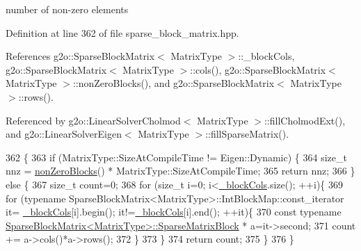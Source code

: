 number of non-\/zero elements 



Definition at line 362 of file sparse\+\_\+block\+\_\+matrix.\+hpp.



References g2o\+::\+Sparse\+Block\+Matrix$<$ Matrix\+Type $>$\+::\+\_\+block\+Cols, g2o\+::\+Sparse\+Block\+Matrix$<$ Matrix\+Type $>$\+::cols(), g2o\+::\+Sparse\+Block\+Matrix$<$ Matrix\+Type $>$\+::non\+Zero\+Blocks(), and g2o\+::\+Sparse\+Block\+Matrix$<$ Matrix\+Type $>$\+::rows().



Referenced by g2o\+::\+Linear\+Solver\+Cholmod$<$ Matrix\+Type $>$\+::fill\+Cholmod\+Ext(), and g2o\+::\+Linear\+Solver\+Eigen$<$ Matrix\+Type $>$\+::fill\+Sparse\+Matrix().


\begin{DoxyCode}
362                                                       \{
363     \textcolor{keywordflow}{if} (MatrixType::SizeAtCompileTime != Eigen::Dynamic) \{
364       \textcolor{keywordtype}{size\_t} nnz = \hyperlink{classg2o_1_1SparseBlockMatrix_a4e2ecdfdec3b47b2f9373c56aecc7d15}{nonZeroBlocks}() * MatrixType::SizeAtCompileTime;
365       \textcolor{keywordflow}{return} nnz;
366     \} \textcolor{keywordflow}{else} \{
367       \textcolor{keywordtype}{size\_t} count=0;
368       \textcolor{keywordflow}{for} (\textcolor{keywordtype}{size\_t} i=0; i<\hyperlink{classg2o_1_1SparseBlockMatrix_ae236d56a01ba4d292450a518621b41f8}{\_blockCols}.size(); ++i)\{
369         \textcolor{keywordflow}{for} (\textcolor{keyword}{typename} SparseBlockMatrix<MatrixType>::IntBlockMap::const\_iterator it=
      \hyperlink{classg2o_1_1SparseBlockMatrix_ae236d56a01ba4d292450a518621b41f8}{\_blockCols}[i].begin(); it!=\hyperlink{classg2o_1_1SparseBlockMatrix_ae236d56a01ba4d292450a518621b41f8}{\_blockCols}[i].end(); ++it)\{
370           \textcolor{keyword}{const} \textcolor{keyword}{typename} \hyperlink{classg2o_1_1SparseBlockMatrix_ab2f7376cbf055803fda6527dcc43e3be}{SparseBlockMatrix<MatrixType>::SparseMatrixBlock}
      * a=it->second;
371           count += a->cols()*a->rows();
372         \}
373       \}
374       \textcolor{keywordflow}{return} count;
375     \}
376   \}
\end{DoxyCode}
